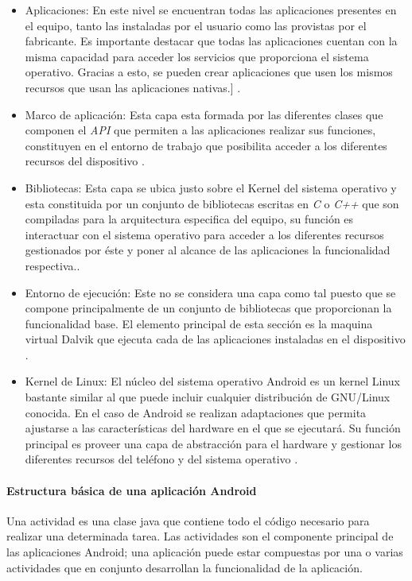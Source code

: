 \begin{itemize}
\item Aplicaciones: En este nivel se encuentran todas las aplicaciones presentes en el equipo, tanto las instaladas por el usuario como las provistas por el fabricante. Es importante destacar que todas las aplicaciones cuentan con la misma capacidad para acceder los servicios que proporciona el sistema operativo. Gracias a esto, se pueden crear aplicaciones que usen los mismos recursos que usan las aplicaciones nativas.] \cite{AAT}.
\item Marco de aplicación: Esta capa esta formada por las diferentes clases que componen el \textit{API} que permiten a las aplicaciones realizar sus funciones, constituyen en el entorno de trabajo que posibilita acceder a los diferentes recursos del dispositivo \cite{AAT}.
\item Bibliotecas: Esta capa se ubica justo sobre el Kernel del sistema operativo y esta constituida por un conjunto de bibliotecas escritas en \textit{C} o \textit{C++} que son compiladas para la arquitectura especifica del equipo, su función es interactuar con el sistema operativo para acceder a los diferentes recursos gestionados por éste y poner al alcance de las aplicaciones la funcionalidad respectiva.\cite{AAT}. 
\item Entorno de ejecución: Este no se considera una capa como tal puesto que se compone principalmente de un conjunto de bibliotecas que proporcionan la funcionalidad base. El elemento principal de esta sección es la maquina virtual Dalvik que ejecuta cada de las aplicaciones instaladas en el dispositivo \cite{AAT}. 
\item Kernel de Linux: El núcleo del sistema operativo Android es un kernel Linux bastante similar al que puede incluir cualquier distribución de GNU/Linux conocida. En el caso de Android se realizan adaptaciones que permita ajustarse a las características del hardware en el que se ejecutará. Su función principal es proveer una capa de abstracción para el hardware y gestionar los diferentes recursos del teléfono y del sistema operativo \cite{AAT}.
\end{itemize}

\paragraph{Estructura básica de una aplicación Android} 

Una actividad es una clase java que contiene todo el código necesario para realizar una determinada tarea. Las actividades son el componente principal de las aplicaciones Android; una aplicación puede estar compuestas por una o varias actividades que en conjunto desarrollan la funcionalidad de la aplicación. 

